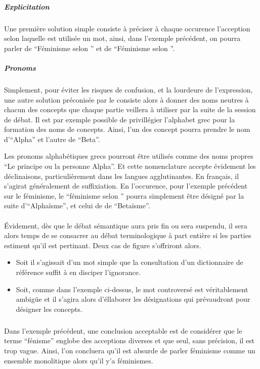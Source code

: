 \paragraph{}
\subparagraph{Explicitation}
Une première solution simple consiste à préciser à chaque occurence l’acception selon laquelle est utilisée un mot, ainsi, dans l’exemple précédent, on pourra parler de \enquote{Féminisme selon \A} et de \enquote{Féminisme selon \B}.

\subparagraph{Pronoms}
Simplement, pour éviter les risques de confusion, et la lourdeure de l’expression, une autre solution préconisée par le \mainabbr{} consiste alors à donner des noms neutres à chacun des concepts que chaque partie veillera à utiliser par la suite de la session de débat. Il est par exemple possible de privillégier l’alphabet grec pour la formation des noms de concepts. Ainsi, l’un des concept pourra prendre le nom d’\enquote{Alpha} et l’autre de \enquote{Beta}.

Les pronoms alphabétiques grecs pourront être utilisés comme des noms propres \enquote{Le principe ou la personne Alpha}. Et cette nomenclature accepte évidement les déclinaisons, particulièrement dans les langues agglutinantes. En français, il s’agirat généralement de suffixiation. En l’occurence, pour l’exemple précédent sur le féminisme, le \enquote{féminisme selon \A} pourra simplement être désigné par la suite d’\enquote{Alphaïsme}, et celui de \B de \enquote{Betaïsme}.

\paragraph{}
Évidement, dès que le débat sémantique aura pris fin ou sera suspendu, il sera alors temps de se consacrer au débat terminologique à part entière si les parties estiment qu’il est pertinant. Deux cas de figure s’offriront alors.
\begin{itemize}
  \item Soit il s’agissait d’un mot simple que la consultation d’un dictionnaire de référence suffit à en disciper l’ignorance.

  \item Soit, comme dans l’exemple ci-dessus, le mot controversé est véritablement ambigüe et il s’agira alors d’éllaborer les désignations qui prévaudront pour désigner les concepts.
\end{itemize}

\subparagraph{}
Dans l’exemple précédent, une conclusion acceptable est de considérer que le terme \enquote{fénisme} englobe des acceptions diverses et que seul, sans précision, il est trop vague. Ainsi, l’on concluera qu’il est absurde de parler  féminisme comme un ensemble monolitique alors qu’il y’a  féminismes.


